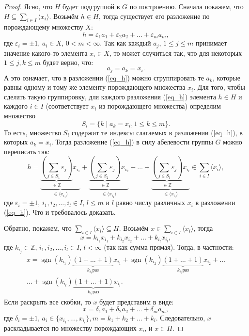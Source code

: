 \documentclass{article}
\DeclareMathOperator{\sgn}{sgn}
\begin{document}
\begin{proof}
    Ясно, что $H$ будет подгруппой в $G$ по построению.
    Сначала покажем, что $H \subseteq \sum_{i \in I} \langle x_i \rangle$. Возьмём $h \in H$, тогда существует его разложение по порождающему множеству $X$: 
    \begin{equation} \label{eq_h} \tag{$\star$}
        h = \varepsilon_1 a_1 + \varepsilon_2 a_2 + \ldots + \varepsilon_m a_m,
    \end{equation}
    где $\varepsilon_i = \pm 1$, $a_i \in X$, $ 0 < m < \infty $.
    Так как каждый $a_j$, $1 \leqslant j \leqslant m$ принимает значение какого-то элемента $x_i \in X$, то может случиться так, что для некоторых $1 \leqslant j,k \leqslant m$ будет верно, что: $$ a_j = a_k = x_i. $$ А это означает, что в разложении (\ref{eq_h}) можно сгруппировать те $a_k$, которые равны одному и тому же элементу порождающего множества $x_i$. Для того, чтобы сделать такую группировку, для каждого разложения (\ref{eq_h}) элемента $h \in H$ и каждого $i \in I$ (соответствует $x_i$ из порождающего множества) определим множество $$S_i = \{k \mid a_k = x_i, 1 \leqslant k \leqslant m \}.$$ То есть, множество $S_i$ содержит те индексы слагаемых в разложении (\ref{eq_h}), в которых $a_k = x_i$. Тогда разложение (\ref{eq_h}) в силу абелевости группы $G$ можно переписать так: $$ h = \underbrace{\underbrace{\left( \sum_{j \in S_1}{\varepsilon_j} \right) }_{\in \mathbb{Z}} x_{i_1}}_{\in \langle x_{i_1} \rangle} + \underbrace{\underbrace{\left( \sum_{j \in S_2}{\varepsilon_j} \right)}_{\in \mathbb{Z}} x_{i_2}}_{\in \langle x_{i_2} \rangle} + \ldots + \underbrace{\underbrace{\left( \sum_{j \in S_{l}}{\varepsilon_j} \right)}_{\in \mathbb{Z}} x_{i_l}}_{\in \langle x_{i_l} \rangle} \in \sum_{i \in I} \langle x_i \rangle, $$ где $\varepsilon_i = \pm 1$, $ i_1, i_2, \ldots, i_l \in I $, $l \leqslant m $ и $l$ равно числу различных $x_i$ в разложении (\ref{eq_h}). Что и требовалось доказать.

    Обратно, покажем, что $\sum_{i \in I} \langle x_i \rangle \subseteq H$. Возьмём $x \in \sum_{i \in I} \langle x_i \rangle$, тогда $$ x = k_{i_1} x_{i_1} + k_{i_2} x_{i_2} + \ldots + k_{i_l} x_{i_l}, $$ где $k_{i_j} \in \mathbb{Z}$, $i_1, i_2, \ldots, i_l \in I$, $l < \infty$ (так как сумма прямая). Тогда, в частности:
    \begin{multline*}
        x = \sgn (k_{i_1}) \underbrace{(1 + \ldots + 1)}_{k_{i_1} \text{раз}} x_{i_1} + \sgn (k_{i_2}) \underbrace{(1 + \ldots + 1)}_{k_{i_2} \text{раз}} x_{i_2} + \ldots \\
        \ldots + \sgn (k_{i_l}) \underbrace{(1 + \ldots + 1)}_{k_{i_l} \text{раз}} x_{i_l}.
    \end{multline*}
    Если раскрыть все скобки, то $x$ будет представим в виде: $$ x = \delta_1 a_1 + \delta_2 a_2 + \ldots + \delta_m a_m, $$ где $\delta_i = \pm 1$, $a_i \in \{x_{i_1}, \ldots, x_{i_l} \}, m = k_1 + k_2 + \ldots + k_l$. Следовательно, $x$ раскладывается по множеству порождающих $x_i$, и $x \in H$.


\end{proof}
\end{document}
